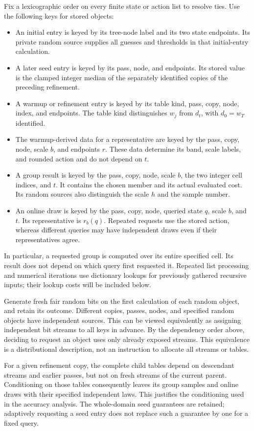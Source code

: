 Fix a lexicographic order on every finite state or action list
to resolve ties.  Use the following keys for stored objects:
\begin{itemize}
\item An initial entry is keyed by its tree-node label and its two
state endpoints.  Its private random source supplies all guesses and
thresholds in that initial-entry calculation.
\item A later seed entry is keyed by its pass, node, and endpoints.
Its stored value is the clamped integer median of the separately
identified copies of the preceding refinement.
\item A warmup or refinement entry is keyed by its table kind, pass,
copy, node, index, and endpoints.  The table kind distinguishes $w_j$
from $d_t$, with $d_0=w_T$ identified.
\item The warmup-derived data for a representative are keyed by the
pass, copy, node, scale $b$, and endpoints $r$.  These data determine
its band, scale labels, and rounded action and do not depend on $t$.
\item A group result is keyed by the pass, copy, node, scale $b$, the
two integer cell indices, and $t$.  It contains the chosen member and
its actual evaluated cost.  Its random sources also distinguish the
scale $h$ and the sample number.
\item An online draw is keyed by the pass, copy, node, queried state
$q$, scale $b$, and $t$.  Its representative is $r_b(q)$.  Repeated
requests use the stored action, whereas different queries may have
independent draws even if their representatives agree.
\end{itemize}
In particular, a requested group is computed over its entire specified
cell.  Its result does not depend on which query first requested it.
Repeated list processing and numerical iterations use dictionary
lookups for previously gathered recursive inputs; their lookup costs
will be included below.

Generate fresh fair random bits on the first calculation of each
random object, and retain its outcome.  Different copies, passes,
nodes, and specified random objects have independent sources.  This
can be viewed equivalently as assigning independent bit streams to
all keys in advance.  By the dependency order above, deciding to
request an object uses only already exposed streams.  This equivalence
is a distributional description, not an instruction to allocate all
streams or tables.

For a given refinement copy, the complete child tables depend on
descendant streams and earlier passes, but not on fresh streams of
the current parent.  Conditioning on those tables consequently
leaves its group samples and online draws with their specified
independent laws.  This justifies the conditioning used in the
accuracy analysis.  The whole-domain seed guarantees are retained;
adaptively requesting a seed entry does not replace such a guarantee
by one for a fixed query.


